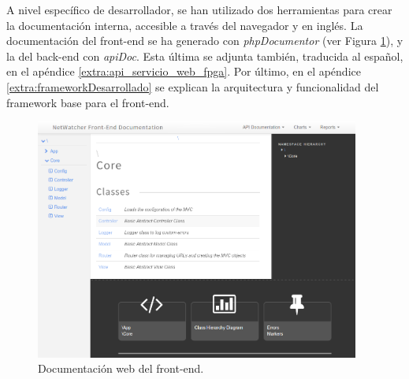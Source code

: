 A nivel específico de desarrollador, se han utilizado dos herramientas para crear la documentación interna, accesible a través del navegador y en inglés. 
La documentación del \gls{front-end} se ha generado con \textit{phpDocumentor} (ver Figura \ref{fig:captura:docsfrontend}), y la del \gls{back-end} con \textit{apiDoc}.
Esta última se adjunta también, traducida al español, en el apéndice \ref{extra:api_servicio_web_fpga}.
Por último, en el apéndice \ref{extra:frameworkDesarrollado} se explican la arquitectura y funcionalidad del \gls{framework} base para el \gls{front-end}.

\begin{figure}[!htp]
  \centering
  \includegraphics[width=0.95\textwidth,clip=true]{graphics/capturas/docs_frontend}
  \caption{Documentación web del \gls{front-end}.}
  \label{fig:captura:docsfrontend}
\end{figure} 
